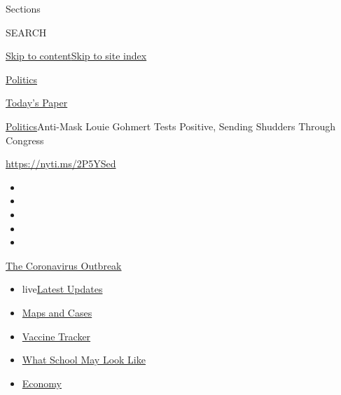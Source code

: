 Sections

SEARCH

\protect\hyperlink{site-content}{Skip to
content}\protect\hyperlink{site-index}{Skip to site index}

\href{https://www.nytimes3xbfgragh.onion/section/politics}{Politics}

\href{https://myaccount.nytimes3xbfgragh.onion/auth/login?response_type=cookie\&client_id=vi}{}

\href{https://www.nytimes3xbfgragh.onion/section/todayspaper}{Today's
Paper}

\href{/section/politics}{Politics}\textbar{}Anti-Mask Louie Gohmert
Tests Positive, Sending Shudders Through Congress

\url{https://nyti.ms/2P5YSed}

\begin{itemize}
\item
\item
\item
\item
\item
\end{itemize}

\href{https://www.nytimes3xbfgragh.onion/news-event/coronavirus?action=click\&pgtype=Article\&state=default\&region=TOP_BANNER\&context=storylines_menu}{The
Coronavirus Outbreak}

\begin{itemize}
\tightlist
\item
  live\href{https://www.nytimes3xbfgragh.onion/2020/08/02/world/coronavirus-updates.html?action=click\&pgtype=Article\&state=default\&region=TOP_BANNER\&context=storylines_menu}{Latest
  Updates}
\item
  \href{https://www.nytimes3xbfgragh.onion/interactive/2020/us/coronavirus-us-cases.html?action=click\&pgtype=Article\&state=default\&region=TOP_BANNER\&context=storylines_menu}{Maps
  and Cases}
\item
  \href{https://www.nytimes3xbfgragh.onion/interactive/2020/science/coronavirus-vaccine-tracker.html?action=click\&pgtype=Article\&state=default\&region=TOP_BANNER\&context=storylines_menu}{Vaccine
  Tracker}
\item
  \href{https://www.nytimes3xbfgragh.onion/interactive/2020/07/29/us/schools-reopening-coronavirus.html?action=click\&pgtype=Article\&state=default\&region=TOP_BANNER\&context=storylines_menu}{What
  School May Look Like}
\item
  \href{https://www.nytimes3xbfgragh.onion/live/2020/07/31/business/stock-market-today-coronavirus?action=click\&pgtype=Article\&state=default\&region=TOP_BANNER\&context=storylines_menu}{Economy}
\end{itemize}

